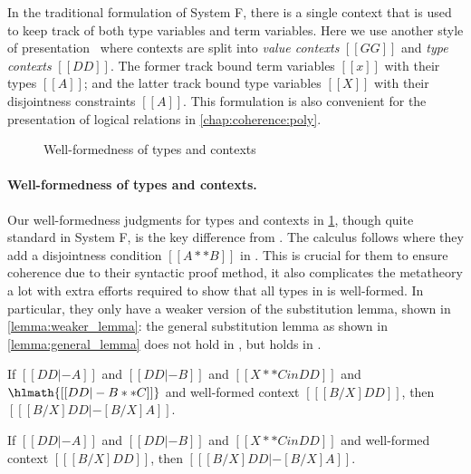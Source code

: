 In the traditional formulation of System F, there is a single context that is
used to keep track of both type variables and term variables. Here we use
another style of presentation~\citep[chap. 16]{Harper_2016} where contexts are
split into \textit{value contexts} $[[GG]]$ and \textit{type contexts} $[[DD]]$.
The former track bound term variables $[[x]]$ with their types $[[A]]$; and the
latter track bound type variables $[[X]]$ with their disjointness constraints
$[[A]]$. This formulation is also convenient for the presentation of logical
relations in \cref{chap:coherence:poly}.

\begin{figure}[t]
  \centering
  \caption{Well-formedness of types and contexts}
  \label{fig:well-formedness:fi}
\end{figure}

\paragraph{Well-formedness of types and contexts.}

Our well-formedness judgments for types and contexts in
\cref{fig:well-formedness:fi}, though quite standard in System F, is the key
difference from \fname. The \fname calculus follows \oname where they add a
disjointness condition $[[ A ** B ]]$ in . This is crucial for
them to ensure coherence due to their syntactic proof method, it also
complicates the metatheory a lot with extra efforts required to show that all
types in \fname is well-formed. In particular, they only have a weaker version
of the substitution lemma, shown in \cref{lemma:weaker_lemma}: the general
substitution lemma as shown in \cref{lemma:general_lemma} does not hold in
\fname, but holds in \fnamee.

\begin{lemma} \label{lemma:weaker_lemma}
  If $[[DD |- A]]$ and $[[DD |- B]]$ and $[[ X ** C in DD  ]]$ and $\hlmath{[[ DD |- B ** C ]]}$
  and well-formed context $[[ [ B / X ] DD    ]]$, then $[[  [ B / X ] DD |- [B / X] A      ]]$.
\end{lemma}

\begin{lemma} \label{lemma:general_lemma}
  If $[[DD |- A]]$ and $[[DD |- B]]$ and $[[ X ** C in DD  ]]$
  and well-formed context $[[ [ B / X ] DD    ]]$, then $[[  [ B / X ] DD |- [B / X] A      ]]$.
\end{lemma}



